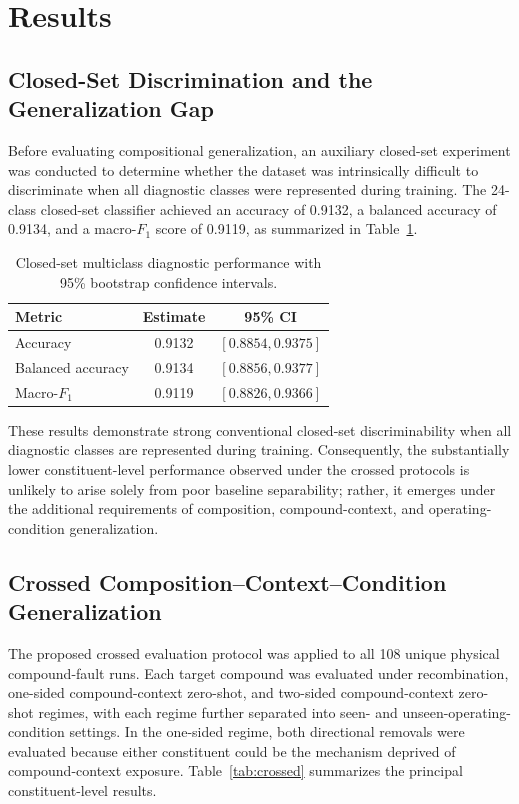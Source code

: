 \section{Results}
\label{sec:results}

\subsection{Closed-Set Discrimination and the Generalization Gap}
\label{sec:closedsetresults}

Before evaluating compositional generalization, an auxiliary closed-set
experiment was conducted to determine whether the dataset was intrinsically
difficult to discriminate when all diagnostic classes were represented
during training. The 24-class closed-set classifier achieved an accuracy of
0.9132, a balanced accuracy of 0.9134, and a macro-$F_1$ score of 0.9119,
as summarized in Table~\ref{tab:closedset}.

\begin{table}[!t]
\caption{Closed-set multiclass diagnostic performance with 95\% bootstrap
confidence intervals.}
\label{tab:closedset}
\centering
\begin{tabular}{l c c}
\toprule
Metric & Estimate & 95\% CI \\
\midrule
Accuracy          & 0.9132 & $[0.8854, 0.9375]$ \\
Balanced accuracy & 0.9134 & $[0.8856, 0.9377]$ \\
Macro-$F_1$       & 0.9119 & $[0.8826, 0.9366]$ \\
\bottomrule
\end{tabular}
\end{table}

These results demonstrate strong conventional closed-set discriminability
when all diagnostic classes are represented during training. Consequently,
the substantially lower constituent-level performance observed under the
crossed protocols is unlikely to arise solely from poor baseline
separability; rather, it emerges under the additional requirements of
composition, compound-context, and operating-condition generalization.

\subsection{Crossed Composition--Context--Condition Generalization}
\label{sec:crossedresults}

The proposed crossed evaluation protocol was applied to all 108 unique
physical compound-fault runs. Each target compound was evaluated under
recombination, one-sided compound-context zero-shot, and two-sided
compound-context zero-shot regimes, with each regime further separated into
seen- and unseen-operating-condition settings. In the one-sided regime,
both directional removals were evaluated because either constituent could
be the mechanism deprived of compound-context exposure.
Table~\ref{tab:crossed} summarizes the principal constituent-level results.

